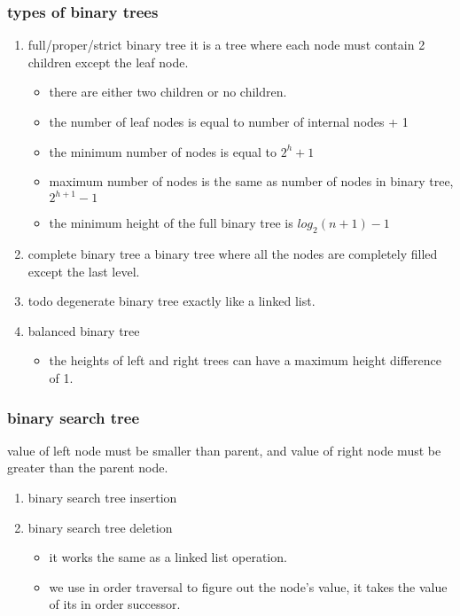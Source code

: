 \documentclass[11pt]{article}
\begin{document}
\subsubsection{types of binary trees}
\label{sec:org42e8d41}
\begin{enumerate}
\item full/proper/strict binary tree
\label{sec:orgc7d3026}
it is a tree where each node must contain 2 children except the leaf node.

\begin{itemize}
\item there are either two children or no children.
\item the number of leaf nodes is equal to number of internal nodes + 1
\item the minimum number of nodes is equal to \(2^h + 1\)
\item maximum number of nodes is the same as number of nodes in binary tree, \(2^{h+1} - 1\)
\item the minimum height of the full binary tree is \(log_2(n+1) - 1\)
\end{itemize}
\item complete binary tree
\label{sec:org9f78063}
a binary tree where all the nodes are completely filled except the last level.
\item todo degenerate binary tree
\label{sec:org1d8b769}
exactly like a linked list.
\item balanced binary tree
\label{sec:org2f9db03}
\begin{itemize}
\item the heights of left and right trees can have a maximum height difference of 1.
\end{itemize}
\end{enumerate}
\subsubsection{binary search tree}
\label{sec:org460b678}
value of left node must be smaller than parent, and value of right node must be greater than the parent node.
\begin{enumerate}
\item binary search tree insertion
\label{sec:orga3d0543}
\item binary search tree deletion
\label{sec:orgbc1beb6}
\begin{itemize}
\item it works the same as a linked list operation.
\item we use in order traversal to figure out the node's value, it takes the value of its in order successor.
\end{itemize}
\end{enumerate}
\end{document}
